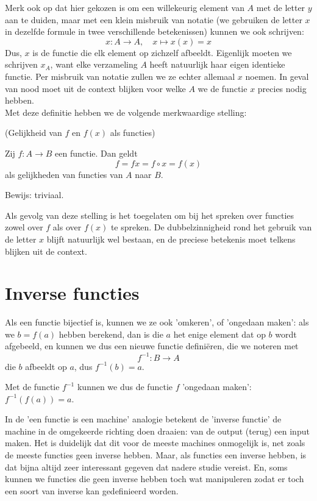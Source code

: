 \documentclass{ximera}
\begin{document}
\begin{uitweiding}
Merk ook op dat hier gekozen is om een willekeurig element van $A$ met de letter $y$ aan te duiden, maar met een klein misbruik van notatie (we gebruiken de letter $x$ in dezelfde formule in twee verschillende betekenissen) kunnen we ook schrijven:
$$
    x:A \to A,\quad x \mapsto x(x) = x
$$
Dus, $x$ is de functie die elk element op zichzelf afbeeldt. Eigenlijk moeten we schrijven $x_A$, want elke verzameling $A$ heeft natuurlijk haar eigen identieke functie. Per misbruik van notatie zullen we ze echter allemaal $x$ noemen. In geval van nood moet uit de context blijken voor welke $A$ we de functie $x$ precies nodig hebben.
\\

Met deze definitie hebben we de volgende merkwaardige stelling:
\begin{proposition} (Gelijkheid van $f$ en $f(x)$ als functies)
    
    Zij $f:A\to B$ een functie. Dan geldt    
    $$
    f = fx = f\circ x = f(x)
    $$
    als gelijkheden van functies van $A$ naar $B$.
\end{proposition}
Bewijs: triviaal.

Als gevolg van deze stelling is het toegelaten om bij het spreken over functies zowel over $f$ als over $f(x)$ te spreken. De dubbelzinnigheid rond het gebruik van de letter $x$ blijft natuurlijk wel bestaan, en de preciese betekenis moet telkens blijken uit de context.

\end{uitweiding}

\section{Inverse functies}

Als een functie bijectief is, kunnen we ze ook 'omkeren', of 'ongedaan maken': als we $b=f(a)$ hebben berekend, dan is die $a$ het enige element dat op $b$ wordt afgebeeld, en kunnen we dus een nieuwe functie definiëren, die we noteren met 
$$f^{-1}: B \rightarrow A$$ 
die $b$ afbeeldt op $a$, dus $f^{-1}(b) = a$.

Met de functie $f^{-1}$ kunnen we dus de functie $f$ 'ongedaan maken': $f^{-1}(f(a)) = a$.

In de 'een functie is een machine' analogie betekent de 'inverse functie' de machine in de omgekeerde richting doen draaien: van de output (terug) een input maken. Het is duidelijk dat dit voor de meeste machines onmogelijk is, net zoals de meeste functies geen inverse hebben. Maar, als functies een inverse hebben, is dat bijna altijd zeer interessant gegeven dat nadere studie vereist. En, soms kunnen we functies die geen inverse hebben toch wat manipuleren zodat er toch een soort van inverse kan gedefinieerd worden.
\end{document}
